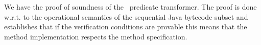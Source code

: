 We have the proof of soundness of the \wpi \ predicate transformer. The proof is done w.r.t. to the operational semantics of the sequential Java bytecode
subset and establishes that if the verification conditions are provable this means that the method implementation respects the method specification.













